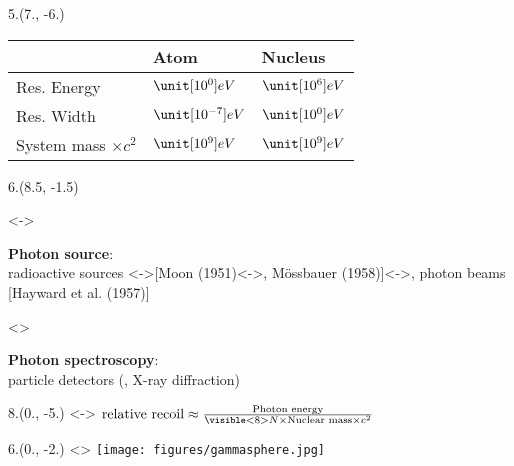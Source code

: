 \begin{textblock}{5.}(7., -6.)
    \begin{center}
        \begin{tabular}{lll}
        & Atom & Nucleus \\
        \hline
        Res. Energy & $\unit[10^{0}]{eV}$ & $\unit[10^{6}]{eV}$ \\
        Res. Width & $\unit[10^{-7}]{eV}$ & $\unit[10^{0}]{eV}$ \\
        System mass $\times c^2$ & $\unit[10^{9}]{eV}$ & $\unit[10^{9}]{eV}$ \\
        \end{tabular}
    \end{center}
\end{textblock}

\begin{textblock}{6.}(8.5, -1.5)
    \begin{itemize}
    \visible<\SLIDEPHOTONSOURCE->{
        \item \textbf{Photon source}: \\ 
        radioactive sources \visible<\SLIDEWHEEL->{[Moon (1951)\visible<\SLIDEMOESSBAUER->{, M\"ossbauer (1958)}]}\visible<\SLIDEBEAM->{, photon beams [Hayward et al. (1957)]}
    }
    \visible<\SLIDEDETECTION>{
        \item \textbf{Photon spectroscopy}: \\
        particle detectors (, X-ray diffraction)
    }
    \end{itemize}
\end{textblock}

\begin{textblock}{8.}(0., -5.)
    \visible<\SLIDERECOIL-\SLIDEMOESSBAUER>{
        $\text{relative recoil} \approx \frac{\text{Photon energy}}{\visible<\SLIDEMOESSBAUER>{N \times } \text{Nuclear mass} \times c^2}$
    }
\end{textblock}

\begin{textblock}{6.}(0., -2.)
    \visible<\SLIDEDETECTION>{
        \texttt{[image: figures/gammasphere.jpg]}
    }
\end{textblock}